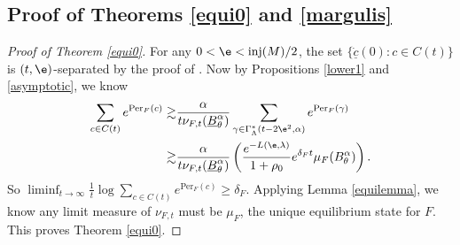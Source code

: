 \documentclass[11pt]{amsart}
\theoremstyle{definition}
\def\inj{{\text{inj}}}
\def\lB{{\underline B}}
\def\a{\alpha}
\def\c{\gamma}   \def\C{\Gamma}
\def\d{\delta}   %
\def\l{\lambda}   \def\L{\Lambda}
\newcommand{\Per}{\mathrm{Per}}
\begin{document}
\subsection{Proof of Theorems \ref{equi0} and \ref{margulis}}
\begin{proof}[Proof of Theorem \ref{equi0}]
For any $0<\e<\inj(M)/2$, the set $\{\underline{\dot  c}(0): c\in C(t)\}$ is $(t,\e)$-separated by the proof of \cite[Theorem B]{Wu2}.
Now by Propositions \ref{lower1} and \ref{asymptotic}, we know
\begin{equation*}
\begin{aligned}
\sum_{c\in C(t)}e^{\Per_F(c)}\gtrsim &\frac{\a}{t\nu_{F,t}(\lB_{\theta}^{\a})}\sum_{\c\in \C^*_\L(t-2\e^2, \a)}e^{\Per_F(\c)}\\
\gtrsim  &\frac{\a}{t\nu_{F,t}(\lB_{\theta}^{\a})}\left(\frac{e^{-L(\e,\l)}}{1+\rho_0}e^{\d_Ft}\mu_F(B_\theta^\a)\right).
\end{aligned}
\end{equation*}
So $\liminf_{t\to \infty}\frac{1}{t}\log \sum_{c\in C(t)}e^{\Per_F(c)}\ge \d_F.$ Applying Lemma \ref{equilemma}, we know any limit measure of $\nu_{F,t}$ must be $\mu_F$, the unique equilibrium state for $F$. This proves Theorem \ref{equi0}.
\end{proof}
\end{document}
